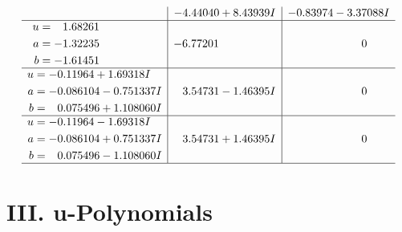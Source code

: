 \documentclass[1p]{elsarticle_modified}
\theoremstyle{definition}
\begin{document}
$$\begin{array}{c|c|c}
 & -4.44040 + 8.43939 I & -0.83974 - 3.37088 I \\ \hline\begin{aligned}
u &= \phantom{-}1.68261\phantom{ +0.000000I} \\
a &= -1.32235\phantom{ +0.000000I} \\
b &= -1.61451\phantom{ +0.000000I}\end{aligned}
 & -6.77201\phantom{ +0.000000I} & \phantom{-0.000000 } 0 \\ \hline\begin{aligned}
u &= -0.11964 + 1.69318 I \\
a &= -0.086104 - 0.751337 I \\
b &= \phantom{-}0.075496 + 1.108060 I\end{aligned}
 & \phantom{-}3.54731 - 1.46395 I & \phantom{-0.000000 } 0 \\ \hline\begin{aligned}
u &= -0.11964 - 1.69318 I \\
a &= -0.086104 + 0.751337 I \\
b &= \phantom{-}0.075496 - 1.108060 I\end{aligned}
 & \phantom{-}3.54731 + 1.46395 I & \phantom{-0.000000 } 0\\
 \hline 
 \end{array}$$\newpage
\newpage\renewcommand{\arraystretch}{1}
\centering \section*{ III. u-Polynomials}
\end{document}
